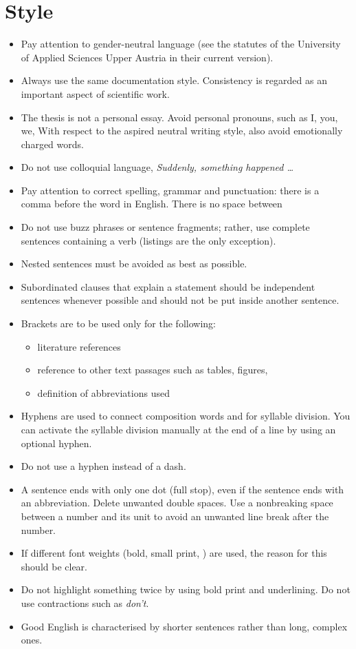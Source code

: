 \section{Style}
\begin{itemize}
	\item Pay attention to gender-neutral language (see the statutes of the University of Applied Sciences Upper Austria in their current version).
	\item Always use the same documentation style. Consistency is regarded as an important aspect of scientific work.
	\item The thesis is not a personal essay. Avoid personal pronouns, such as I, you, we, \etc With respect to the aspired neutral writing style, also avoid emotionally charged words.
	\item Do not use colloquial language, \eg \textit{Suddenly, something happened \dots}
	\item Pay attention to correct spelling, grammar and punctuation: there is a comma before the word \textit{\etc} in English. There is no space between \textit{\eg}
	\item Do not use buzz phrases or sentence fragments; rather, use complete sentences containing a verb (listings are the only exception).
	\item Nested sentences must be avoided as best as possible.
	\item Subordinated clauses that explain a statement should be independent sentences whenever possible and should not be put inside another sentence.
	\item Brackets are to be used only for the following:
	\begin{itemize}
		\item literature references
		\item reference to other text passages such as tables, figures, \etc
		\item definition of abbreviations used
	\end{itemize}
	\item Hyphens are used to connect composition words and for syllable division. You can activate the syllable division manually at the end of a line by using an optional hyphen.
	\item Do not use a hyphen instead of a dash.
	\item A sentence ends with only one dot (full stop), even if the sentence ends with an abbreviation. Delete unwanted double spaces. Use a nonbreaking space between a number and its unit to avoid an unwanted line break after the number.
	\item If different font weights (bold, small print, \etc) are used, the reason for this should be clear.
	\item Do not highlight something twice by using bold print and underlining. Do not use contractions such as \textit{don’t}.
	\item Good English is characterised by shorter sentences rather than long, complex ones.
\end{itemize}

